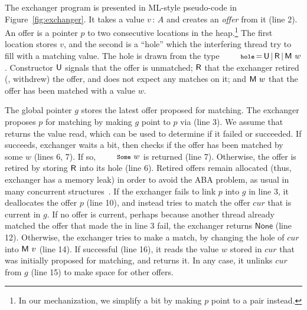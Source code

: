 The exchanger program is presented in ML-style pseudo-code in
Figure~\ref{fig:exchanger}. It takes a value $v\,{:}\,A$ and creates
an \emph{offer} from it (line 2). An offer is a pointer $p$ to two
consecutive locations in the heap.\footnote{In our mechanization, we
  simplify a bit by making $p$ point to a pair instead.}
%
The first location stores $v$, and the second is a ``hole'' which the
interfering thread try to fill with a matching value. The hole is
drawn from the type
$\esc{hole}\,{=}\,\Unmatched\,{\mid}\,\Retired\,{\mid}\,\Matched
w$. Constructor ${\mathsf{U}}$ signals that the offer is unmatched;
${\mathsf{R}}$ that the exchanger retired (\ie, withdrew) the offer, and
does not expect any matches on it; and ${\mathsf{M}\ w}$ that the offer has
been matched with a value $w$.

The global pointer $g$ stores the latest offer proposed for
matching. The exchanger proposes $p$ for matching by making $g$ point
to $p$ via  (line 3). We assume that  returns the
value read, which can be used to determine if it failed or
succeeded. If  succeeds, exchanger waits a bit, then checks
if the offer has been matched by some $w$ (lines 6, 7). If so,
$\esc{Some}\ w$ is returned (line 7). Otherwise, the offer is retired
by storing ${\mathsf{R}}$ into its hole (line 6). Retired offers remain
allocated (thus, exchanger has a memory leak) in order to avoid the
ABA problem, as usual in many concurrent
structures~\cite{Herlihy-Shavit:08,Treiber:TR}.
%
If the exchanger fails to link $p$ into $g$ in line 3, it deallocates
the offer $p$ (line 10), and instead tries to match the offer $cur$
that is current in $g$. If no offer is current, perhaps because
another thread already matched the offer that made the  in
line 3 fail, the exchanger returns $\mathsf{None}$ (line
12). Otherwise, the exchanger tries to make a match, by changing the
hole of $cur$ into ${\mathsf{M}\ v}$ (line 14). If successful (line 16), it
reads the value $w$ stored in $cur$ that was initially proposed for
matching, and returns it. In any case, it unlinks $cur$ from $g$ (line
15) to make space for other offers.
%

